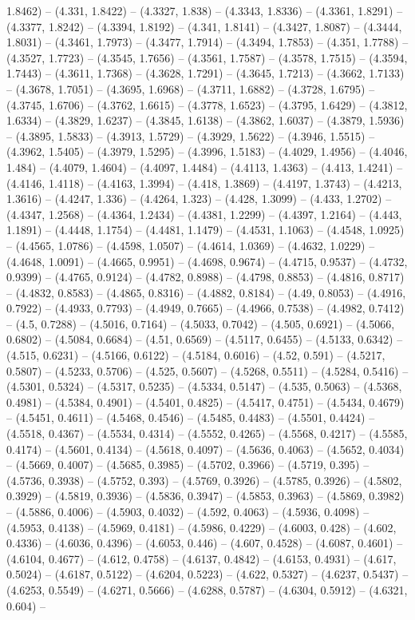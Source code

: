 1.8462) -- (4.331, 1.8422) -- (4.3327, 1.838) -- (4.3343, 1.8336) -- (4.3361, 1.8291) -- (4.3377, 1.8242) -- (4.3394, 1.8192) -- (4.341, 1.8141) -- (4.3427, 1.8087) -- (4.3444, 1.8031) -- (4.3461, 1.7973) -- (4.3477, 1.7914) -- (4.3494, 1.7853) -- (4.351, 1.7788) -- (4.3527, 1.7723) -- (4.3545, 1.7656) -- (4.3561, 1.7587) -- (4.3578, 1.7515) -- (4.3594, 1.7443) -- (4.3611, 1.7368) -- (4.3628, 1.7291) -- (4.3645, 1.7213) -- (4.3662, 1.7133) -- (4.3678, 1.7051) -- (4.3695, 1.6968) -- (4.3711, 1.6882) -- (4.3728, 1.6795) -- (4.3745, 1.6706) -- (4.3762, 1.6615) -- (4.3778, 1.6523) -- (4.3795, 1.6429) -- (4.3812, 1.6334) -- (4.3829, 1.6237) -- (4.3845, 1.6138) -- (4.3862, 1.6037) -- (4.3879, 1.5936) -- (4.3895, 1.5833) -- (4.3913, 1.5729) -- (4.3929, 1.5622) -- (4.3946, 1.5515) -- (4.3962, 1.5405) -- (4.3979, 1.5295) -- (4.3996, 1.5183) -- (4.4029, 1.4956) -- (4.4046, 1.484) -- (4.4079, 1.4604) -- (4.4097, 1.4484) -- (4.4113, 1.4363) -- (4.413, 1.4241) -- (4.4146, 1.4118) -- (4.4163, 1.3994) -- (4.418, 1.3869) -- (4.4197, 1.3743) -- (4.4213, 1.3616) -- (4.4247, 1.336) -- (4.4264, 1.323) -- (4.428, 1.3099) -- (4.433, 1.2702) -- (4.4347, 1.2568) -- (4.4364, 1.2434) -- (4.4381, 1.2299) -- (4.4397, 1.2164) -- (4.443, 1.1891) -- (4.4448, 1.1754) -- (4.4481, 1.1479) -- (4.4531, 1.1063) -- (4.4548, 1.0925) -- (4.4565, 1.0786) -- (4.4598, 1.0507) -- (4.4614, 1.0369) -- (4.4632, 1.0229) -- (4.4648, 1.0091) -- (4.4665, 0.9951) -- (4.4698, 0.9674) -- (4.4715, 0.9537) -- (4.4732, 0.9399) -- (4.4765, 0.9124) -- (4.4782, 0.8988) -- (4.4798, 0.8853) -- (4.4816, 0.8717) -- (4.4832, 0.8583) -- (4.4865, 0.8316) -- (4.4882, 0.8184) -- (4.49, 0.8053) -- (4.4916, 0.7922) -- (4.4933, 0.7793) -- (4.4949, 0.7665) -- (4.4966, 0.7538) -- (4.4982, 0.7412) -- (4.5, 0.7288) -- (4.5016, 0.7164) -- (4.5033, 0.7042) -- (4.505, 0.6921) -- (4.5066, 0.6802) -- (4.5084, 0.6684) -- (4.51, 0.6569) -- (4.5117, 0.6455) -- (4.5133, 0.6342) -- (4.515, 0.6231) -- (4.5166, 0.6122) -- (4.5184, 0.6016) -- (4.52, 0.591) -- (4.5217, 0.5807) -- (4.5233, 0.5706) -- (4.525, 0.5607) -- (4.5268, 0.5511) -- (4.5284, 0.5416) -- (4.5301, 0.5324) -- (4.5317, 0.5235) -- (4.5334, 0.5147) -- (4.535, 0.5063) -- (4.5368, 0.4981) -- (4.5384, 0.4901) -- (4.5401, 0.4825) -- (4.5417, 0.4751) -- (4.5434, 0.4679) -- (4.5451, 0.4611) -- (4.5468, 0.4546) -- (4.5485, 0.4483) -- (4.5501, 0.4424) -- (4.5518, 0.4367) -- (4.5534, 0.4314) -- (4.5552, 0.4265) -- (4.5568, 0.4217) -- (4.5585, 0.4174) -- (4.5601, 0.4134) -- (4.5618, 0.4097) -- (4.5636, 0.4063) -- (4.5652, 0.4034) -- (4.5669, 0.4007) -- (4.5685, 0.3985) -- (4.5702, 0.3966) -- (4.5719, 0.395) -- (4.5736, 0.3938) -- (4.5752, 0.393) -- (4.5769, 0.3926) -- (4.5785, 0.3926) -- (4.5802, 0.3929) -- (4.5819, 0.3936) -- (4.5836, 0.3947) -- (4.5853, 0.3963) -- (4.5869, 0.3982) -- (4.5886, 0.4006) -- (4.5903, 0.4032) -- (4.592, 0.4063) -- (4.5936, 0.4098) -- (4.5953, 0.4138) -- (4.5969, 0.4181) -- (4.5986, 0.4229) -- (4.6003, 0.428) -- (4.602, 0.4336) -- (4.6036, 0.4396) -- (4.6053, 0.446) -- (4.607, 0.4528) -- (4.6087, 0.4601) -- (4.6104, 0.4677) -- (4.612, 0.4758) -- (4.6137, 0.4842) -- (4.6153, 0.4931) -- (4.617, 0.5024) -- (4.6187, 0.5122) -- (4.6204, 0.5223) -- (4.622, 0.5327) -- (4.6237, 0.5437) -- (4.6253, 0.5549) -- (4.6271, 0.5666) -- (4.6288, 0.5787) -- (4.6304, 0.5912) -- (4.6321, 0.604) -- 